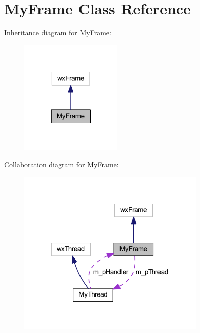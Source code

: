 \hypertarget{class_my_frame}{\section{My\-Frame Class Reference}
\label{class_my_frame}
}


Inheritance diagram for My\-Frame\-:\nopagebreak
\begin{figure}[H]
\begin{center}
\leavevmode
\includegraphics[width=138pt]{class_my_frame__inherit__graph}
\end{center}
\end{figure}


Collaboration diagram for My\-Frame\-:\nopagebreak
\begin{figure}[H]
\begin{center}
\leavevmode
\includegraphics[width=254pt]{class_my_frame__coll__graph}
\end{center}
\end{figure}
